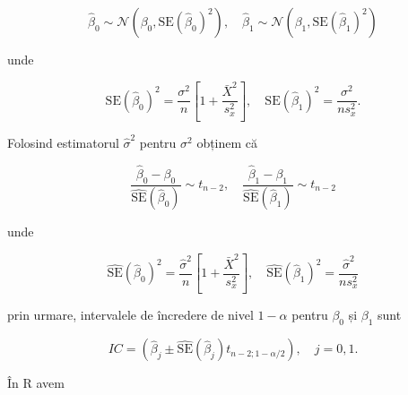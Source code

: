 \documentclass[]{article}
\begin{document}
\[
\hat\beta_0\sim\mathcal{N}\left(\beta_0,\mathrm{SE}(\hat\beta_0)^2\right),\quad\hat\beta_1\sim\mathcal{N}\left(\beta_1,\mathrm{SE}(\hat\beta_1)^2\right)
\]

unde

\[
\mathrm{SE}(\hat\beta_0)^2=\frac{\sigma^2}{n}\left[1+\frac{\bar X^2}{s_x^2}\right],\quad \mathrm{SE}(\hat\beta_1)^2=\frac{\sigma^2}{ns_x^2}.
\]

Folosind estimatorul \(\hat\sigma^2\) pentru \(\sigma^2\) obținem că

\[
\frac{\hat\beta_0-\beta_0}{\hat{\mathrm{SE}}(\hat\beta_0)}\sim t_{n-2},\quad\frac{\hat\beta_1-\beta_1}{\hat{\mathrm{SE}}(\hat\beta_1)}\sim t_{n-2}
\]

unde

\[
\hat{\mathrm{SE}}(\hat\beta_0)^2=\frac{\hat\sigma^2}{n}\left[1+\frac{\bar X^2}{s_x^2}\right],\quad \hat{\mathrm{SE}}(\hat\beta_1)^2=\frac{\hat\sigma^2}{ns_x^2}
\]

prin urmare, intervalele de încredere de nivel \(1-\alpha\) pentru
\(\beta_0\) și \(\beta_1\) sunt

\[
IC = \left(\hat\beta_j\pm\hat{\mathrm{SE}}(\hat\beta_j)t_{n-2;1-\alpha/2}\right),\quad j=0,1.
\]

În R avem
\end{document}
